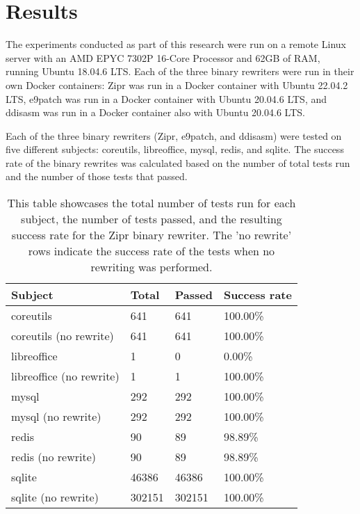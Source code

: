 \documentclass[a4paper,11pt,oneside]{report}
\begin{document}
\chapter{Results}

The experiments conducted as part of this research were run on a remote Linux server with an 
AMD EPYC 7302P 16-Core Processor and 62GB of RAM, running Ubuntu 18.04.6 LTS. Each of the three
binary rewriters were run in their own Docker containers: Zipr was run in a Docker container 
with Ubuntu 22.04.2 LTS, e9patch was run in a Docker container with Ubuntu 20.04.6 LTS, and 
ddisasm was run in a Docker container also with Ubuntu 20.04.6 LTS.

Each of the three binary rewriters (Zipr, e9patch, and ddisasm) were tested on five different 
subjects: coreutils, libreoffice, mysql, redis, and sqlite. The success rate of the binary 
rewrites was calculated based on the number of total tests run and the number of those tests that passed.

    \begin{table}[h]
    \centering
    \caption{This table showcases the total number of tests run for each subject, 
    the number of tests passed, and the resulting success rate for the Zipr binary rewriter. 
    The 'no rewrite' rows indicate the success rate of the tests when no rewriting was performed.}
    \begin{tabular}{|l|l|l|l|}
    \hline
    Subject & Total & Passed & Success rate \\ \hline
    coreutils & 641 & 641 & 100.00\% \\ \hline
    coreutils (no rewrite) & 641 & 641 & 100.00\% \\ \hline
    libreoffice & 1 & 0 & 0.00\% \\ \hline
    libreoffice (no rewrite) & 1 & 1 & 100.00\% \\ \hline
    mysql & 292 & 292 & 100.00\% \\ \hline
    mysql (no rewrite) & 292 & 292 & 100.00\% \\ \hline
    redis & 90 & 89 & 98.89\% \\ \hline
    redis (no rewrite) & 90 & 89 & 98.89\% \\ \hline
    sqlite & 46386 & 46386 & 100.00\% \\ \hline
    sqlite (no rewrite) & 302151 & 302151 & 100.00\% \\ \hline
    \end{tabular}
    \end{table}
    
\end{document}
